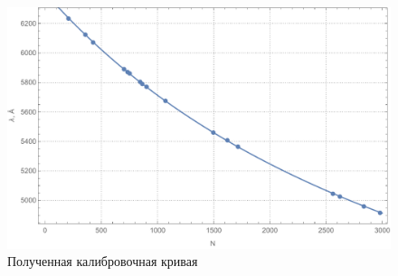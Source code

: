 \documentclass[a4paper, 12pt]{article}
\begin{document}
\begin{figure}[h]
	\centering
	\includegraphics[scale=0.7]{plot2.pdf}
	\caption{Полученная калибровочная кривая}
	\label{plot2}
\end{figure}
\end{document}
